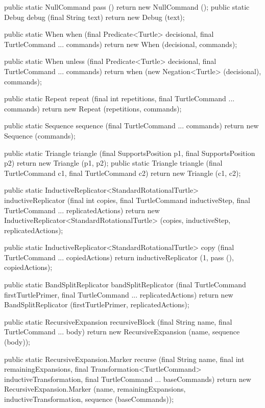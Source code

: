 \documentclass{report}
\begin{document}
\begin{javacode}
{  public static NullCommand pass  ()                  {return new NullCommand ();}
  public static Debug       debug (final String text) {return new Debug (text);}

  public static When     when     (final Predicate<Turtle> decisional, final TurtleCommand ... commands) {
    return new When (decisional, commands);
  }

  public static When     unless   (final Predicate<Turtle> decisional, final TurtleCommand ... commands) {
    return when (new Negation<Turtle> (decisional), commands);
  }

  public static Repeat   repeat   (final int repetitions, final TurtleCommand ... commands)
    {return new Repeat (repetitions, commands);}

  public static Sequence sequence (final TurtleCommand ... commands) {return new Sequence (commands);}

  public static Triangle triangle (final SupportsPosition p1, final SupportsPosition p2) {return new Triangle (p1, p2);}
  public static Triangle triangle (final TurtleCommand    c1, final TurtleCommand    c2) {return new Triangle (c1, c2);}

  public static InductiveReplicator<StandardRotationalTurtle> inductiveReplicator
      (final int copies, final TurtleCommand inductiveStep, final TurtleCommand ... replicatedActions) {
    return new InductiveReplicator<StandardRotationalTurtle> (copies, inductiveStep, replicatedActions);
  }

  public static InductiveReplicator<StandardRotationalTurtle> copy (final TurtleCommand ... copiedActions) {
    return inductiveReplicator (1, pass (), copiedActions);
  }

  public static BandSplitReplicator bandSplitReplicator (final TurtleCommand firstTurtlePrimer,
                                                         final TurtleCommand ... replicatedActions) {
    return new BandSplitReplicator (firstTurtlePrimer, replicatedActions);
  }

  public static RecursiveExpansion recursiveBlock (final String name, final TurtleCommand ... body) {
    return new RecursiveExpansion (name, sequence (body));
  }

  public static RecursiveExpansion.Marker recurse (final String name, final int remainingExpansions,
                                                   final Transformation<TurtleCommand> inductiveTransformation,
                                                   final TurtleCommand ... baseCommands) {
    return new RecursiveExpansion.Marker (name, remainingExpansions, inductiveTransformation, sequence (baseCommands));
  }

}
\end{javacode}
\end{document}
